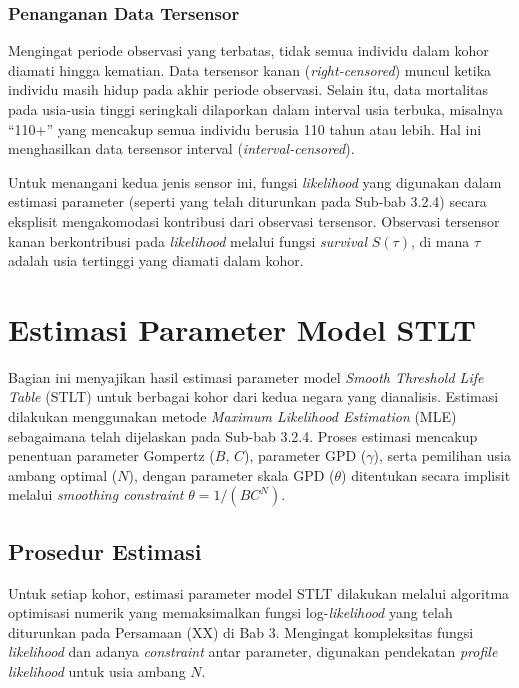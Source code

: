\subsubsection{Penanganan Data Tersensor}
Mengingat periode observasi yang terbatas, tidak semua individu dalam kohor diamati hingga kematian. Data tersensor kanan (\textit{right-censored}) muncul ketika individu masih hidup pada akhir periode observasi. Selain itu, data mortalitas pada usia-usia tinggi seringkali dilaporkan dalam interval usia terbuka, misalnya ``110+'' yang mencakup semua individu berusia 110 tahun atau lebih. Hal ini menghasilkan data tersensor interval (\textit{interval-censored}). 

Untuk menangani kedua jenis sensor ini, fungsi \textit{likelihood} yang digunakan dalam estimasi parameter (seperti yang telah diturunkan pada Sub-bab 3.2.4) secara eksplisit mengakomodasi kontribusi dari observasi tersensor. Observasi tersensor kanan berkontribusi pada \textit{likelihood} melalui fungsi \textit{survival} $S(\tau)$, di mana $\tau$ adalah usia tertinggi yang diamati dalam kohor.

\section{Estimasi Parameter Model STLT}

Bagian ini menyajikan hasil estimasi parameter model \textit{Smooth Threshold Life Table} (STLT) untuk berbagai kohor dari kedua negara yang dianalisis. Estimasi dilakukan menggunakan metode \textit{Maximum Likelihood Estimation} (MLE) sebagaimana telah dijelaskan pada Sub-bab 3.2.4. Proses estimasi mencakup penentuan parameter Gompertz ($B$, $C$), parameter GPD ($\gamma$), serta pemilihan usia ambang optimal ($N$), dengan parameter skala GPD ($\theta$) ditentukan secara implisit melalui \textit{smoothing constraint} $\theta = 1/(BC^N)$.

\subsection{Prosedur Estimasi}

Untuk setiap kohor, estimasi parameter model STLT dilakukan melalui algoritma optimisasi numerik yang memaksimalkan fungsi log-\textit{likelihood} yang telah diturunkan pada Persamaan (XX) di Bab 3. Mengingat kompleksitas fungsi \textit{likelihood} dan adanya \textit{constraint} antar parameter, digunakan pendekatan \textit{profile likelihood} untuk usia ambang $N$.

